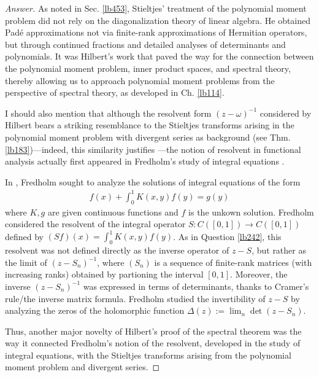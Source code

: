 \documentclass[12pt,b5paper,notitlepage]{article}
\theoremstyle{definition}
\theoremstyle{plain}
\numberwithin{equation}{section}
\begin{document}
\begin{proof}[Answer]
As noted in Sec. \ref{lb453}, Stieltjes' treatment of the polynomial moment problem did not rely on the diagonalization theory of linear algebra. He obtained Pad\'e approximations not via finite-rank approximations of Hermitian operators, but through continued fractions and detailed analyses of determinants and polynomials. It was Hilbert's work that paved the way for the connection between the polynomial moment problem, inner product spaces, and spectral theory, thereby allowing us to approach polynomial moment problems from the perspective of spectral theory, as developed in Ch. \ref{lb114}.

I should also mention that although the resolvent form $(z-\omega)^{-1}$ considered by Hilbert bears a striking resemblance to the Stieltjes transforms arising in the polynomial moment problem with divergent series as background (see Thm. \ref{lb183})---indeed, this similarity justifies ---the notion of resolvent in functional analysis actually first appeared in Fredholm's study of integral equations \cite{Fre03}. 

In \cite{Fre03}, Fredholm sought to analyze the solutions of integral equations of the form
\begin{align*}
f(x)+\int_0^1K(x,y)f(y)=g(y)
\end{align*}
where $K,g$ are given continuous functions and $f$ is the unkown solution. Fredholm considered the resolvent of the integral operator $S:C([0,1])\rightarrow C([0,1])$ defined by $(Sf)(x)=\int_0^1K(x,y)f(y)$. As in Question \ref{lb242}, this resolvent was not defined directly as the inverse operator of $z-S$, but rather as the limit of $(z-S_n)^{-1}$, where $(S_n)$ is a sequence of finite-rank matrices (with increasing ranks) obtained by partioning the interval $[0,1]$. Moreover, the inverse $(z-S_n)^{-1}$ was expressed in terms of determinants, thanks to Cramer's rule/the inverse matrix formula. Fredholm studied the invertibility of $z-S$ by analyzing the zeros of the holomorphic function $\Delta(z):=\lim_n \det(z-S_n)$.



Thus, another major novelty of Hilbert’s proof of the spectral theorem was the way it connected Fredholm’s notion of the resolvent, developed in the study of integral equations, with the Stieltjes transforms arising from the polynomial moment problem and divergent series.
\end{proof}
\end{document}
